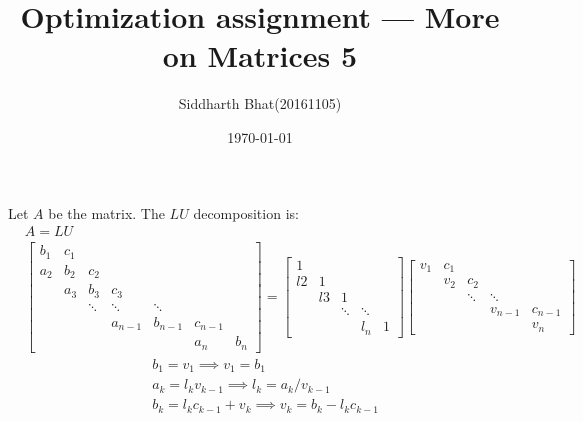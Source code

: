 \documentclass[11pt]{article}
\author{Siddharth Bhat(20161105)}
\title{Optimization assignment --- More on Matrices 5}
\date{\today}
\begin{document}
\maketitle
\thispagestyle{fancy}
Let $A$ be the matrix. The $LU$ decomposition is:
\begin{align*}
    &A = LU \\
    &\begin{bmatrix} 
    b_1 & c_1 & &  &\\
    a_2 & b_2 & c_2 & & \\
     & a_3 & b_3 & c_3  & \\
     & &  \ddots & \ddots & \ddots \\
     &&  & a_{n-1} & b_{n-1} & c_{n-1} \\
     &  & & & & a_n & b_n
\end{bmatrix} =
\begin{bmatrix} 1 \\
    l2 & 1 \\
       & l3 & 1 \\
       & & \ddots & \ddots \\
       &    & & l_n & 1
    \end{bmatrix}
 \begin{bmatrix}
v_1 & c_1 \\
    & v_2 & c_2 \\
    & & \ddots & \ddots \\
    & & & v_{n-1} & c_{n-1} \\
    & & & & v_n
\end{bmatrix}
\end{align*}
\begin{align*}
    &b_1 = v_1 \implies v_1 = b_1 \\
    &a_k = l_k v_{k-1} \implies l_k = a_k / v_{k-1} \\
    &b_k = l_k c_{k-1} + v_k \implies v_k = b_k - l_k c_{k-1}
\end{align*}
\end{document}
